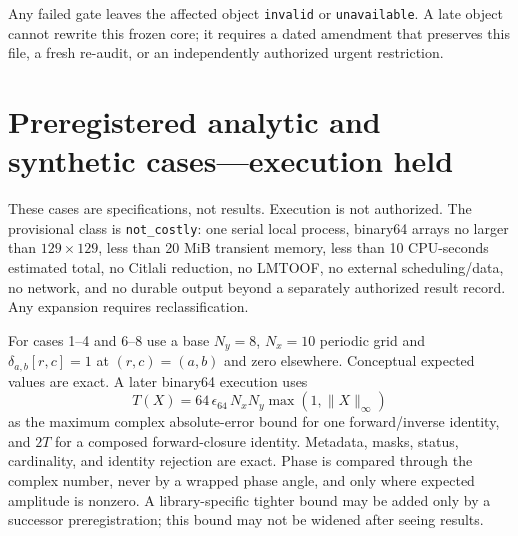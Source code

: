 \documentclass[11pt]{article}
\newcommand{\NA}{\texttt{unavailable}}
\begin{document}
Any failed gate leaves the affected object \texttt{invalid} or \NA.  A late
object cannot rewrite this frozen core; it requires a dated amendment that
preserves this file, a fresh re-audit, or an independently authorized urgent
restriction.

\section{Preregistered analytic and synthetic cases---execution held}

These cases are specifications, not results.  Execution is not authorized.
The provisional class is \texttt{not\_costly}: one serial local process,
binary64 arrays no larger than $129\times129$, less than 20 MiB transient
memory, less than 10 CPU-seconds estimated total, no Citlali reduction, no
LMTOOF, no external scheduling/data, no network, and no durable output beyond
a separately authorized result record.  Any expansion requires
reclassification.

For cases 1--4 and 6--8 use a base $N_y=8$, $N_x=10$ periodic grid and
$\delta_{a,b}[r,c]=1$ at $(r,c)=(a,b)$ and zero elsewhere.  Conceptual expected
values are exact.  A later binary64 execution uses
\[
 T(X)=64\,\epsilon_{64}\,N_xN_y
 \max(1,\|X\|_\infty)
\]
as the maximum complex absolute-error bound for one forward/inverse identity,
and $2T$ for a composed forward-closure identity.  Metadata, masks, status,
cardinality, and identity rejection are exact.  Phase is compared through the
complex number, never by a wrapped phase angle, and only where expected
amplitude is nonzero.  A library-specific tighter bound may be added only by a
successor preregistration; this bound may not be widened after seeing results.
\end{document}
